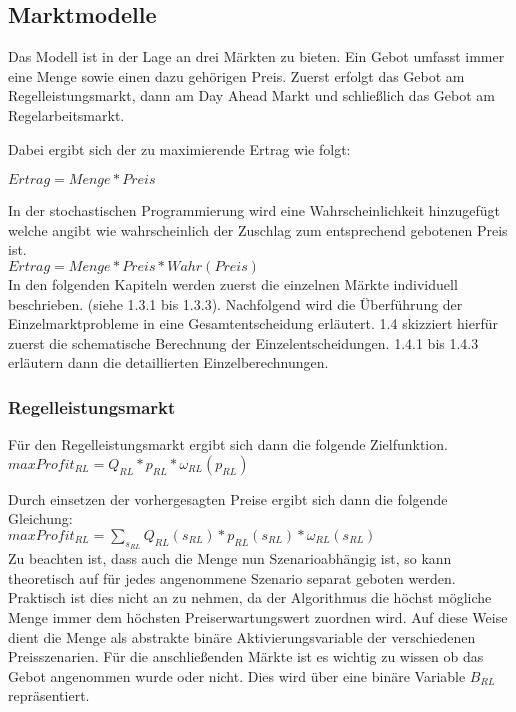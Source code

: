 \subsection{Marktmodelle}

Das Modell ist in der Lage an drei Märkten zu bieten. Ein Gebot umfasst immer eine Menge sowie einen dazu gehörigen Preis. Zuerst erfolgt das Gebot am Regelleistungsmarkt, dann am Day Ahead Markt und schließlich das Gebot am Regelarbeitsmarkt.

Dabei ergibt sich der zu maximierende Ertrag wie folgt:

$Ertrag = Menge * Preis$

In der stochastischen Programmierung wird eine Wahrscheinlichkeit hinzugefügt welche angibt wie wahrscheinlich der Zuschlag zum entsprechend gebotenen Preis ist.\\

$Ertrag = Menge * Preis * Wahr(Preis)$\\

In den folgenden Kapiteln werden zuerst die einzelnen Märkte  individuell beschrieben. (siehe 1.3.1 bis 1.3.3).
Nachfolgend wird die Überführung der Einzelmarktprobleme in eine Gesamtentscheidung erläutert.
1.4 skizziert hierfür zuerst die schematische Berechnung der Einzelentscheidungen.
1.4.1 bis 1.4.3 erläutern dann die detaillierten Einzelberechnungen.

\subsubsection{Regelleistungsmarkt}
Für den Regelleistungsmarkt ergibt sich dann die folgende Zielfunktion.\\

$max Profit_{RL} = Q_{RL} * p_{RL} * \omega_{RL}(p_{RL})$

Durch einsetzen der vorhergesagten Preise ergibt sich dann die folgende Gleichung:\\

$max Profit_{RL} = \sum_{s_{RL}} Q_{RL}(s_{RL}) * p_{RL}(s_{RL}) * \omega_{RL}(s_{RL})$\\

Zu beachten ist, dass auch die Menge nun Szenarioabhängig ist, so kann theoretisch auf für jedes angenommene Szenario separat geboten werden. Praktisch ist dies nicht an zu nehmen, da der Algorithmus die höchst mögliche Menge immer dem höchsten Preiserwartungswert  zuordnen wird. Auf diese Weise dient die Menge als abstrakte binäre Aktivierungsvariable der verschiedenen Preisszenarien.
Für die anschließenden Märkte ist es wichtig zu wissen ob das Gebot angenommen wurde oder nicht. Dies wird über eine binäre Variable $B_{RL}$ repräsentiert.

